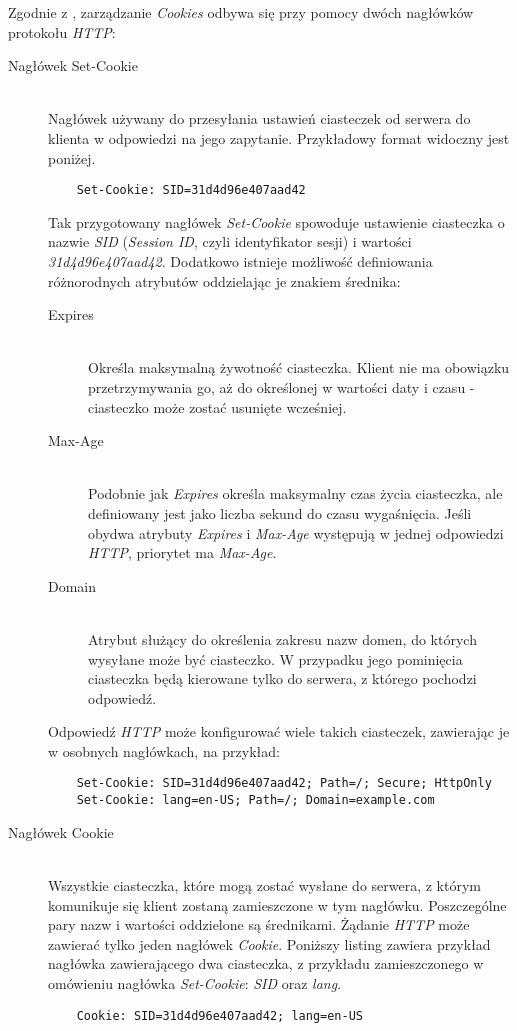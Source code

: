 \documentclass[11pt]{aghdpl}
\begin{document}
Zgodnie z \cite{RfcC11}, zarządzanie \emph{Cookies} odbywa się przy pomocy dwóch nagłówków protokołu \emph{HTTP}:
\begin{description}
\item[Nagłówek Set-Cookie] \hfill \\
	Nagłówek używany do przesyłania ustawień ciasteczek od serwera do klienta w odpowiedzi na jego zapytanie. Przykładowy format widoczny jest poniżej.
	\begin{lstlisting}
	Set-Cookie: SID=31d4d96e407aad42
	\end{lstlisting}
	Tak przygotowany nagłówek \emph{Set-Cookie} spowoduje ustawienie ciasteczka o nazwie \emph{SID} (\emph{Session ID}, czyli identyfikator sesji) i wartości \emph{31d4d96e407aad42}. Dodatkowo istnieje możliwość definiowania różnorodnych atrybutów oddzielając je znakiem średnika:
	\begin{description}
	\item[Expires] \hfill \\
	Określa maksymalną żywotność ciasteczka. Klient nie ma obowiązku przetrzymywania go, aż do określonej w wartości daty i czasu - ciasteczko może zostać usunięte wcześniej.
	\item[Max-Age] \hfill \\
	Podobnie jak \emph{Expires} określa maksymalny czas życia ciasteczka, ale definiowany jest jako liczba sekund do czasu wygaśnięcia. Jeśli obydwa atrybuty \emph{Expires} i \emph{Max-Age} występują w jednej odpowiedzi \emph{HTTP}, priorytet ma \emph{Max-Age}.
	\item[Domain] \hfill \\
	Atrybut służący do określenia zakresu nazw domen, do których wysyłane może być ciasteczko. W przypadku jego pominięcia ciasteczka będą kierowane tylko do serwera, z którego pochodzi odpowiedź.
	\end{description}
	Odpowiedź \emph{HTTP} może konfigurować wiele takich ciasteczek, zawierając je w osobnych nagłówkach, na przykład:
	\begin{lstlisting}
	Set-Cookie: SID=31d4d96e407aad42; Path=/; Secure; HttpOnly
	Set-Cookie: lang=en-US; Path=/; Domain=example.com
	\end{lstlisting}
\item[Nagłówek Cookie] \hfill \\
	Wszystkie ciasteczka, które mogą zostać wysłane do serwera, z którym komunikuje się klient zostaną zamieszczone w tym nagłówku. Poszczególne pary nazw i wartości oddzielone są średnikami. Żądanie \emph{HTTP} może zawierać tylko jeden nagłówek \emph{Cookie}. Poniższy listing zawiera przykład nagłówka zawierającego dwa ciasteczka, z przykładu zamieszczonego w omówieniu nagłówka \emph{Set-Cookie}: \emph{SID} oraz \emph{lang}.
	\begin{lstlisting}
	Cookie: SID=31d4d96e407aad42; lang=en-US
	\end{lstlisting}
\end{description}
\end{document}
